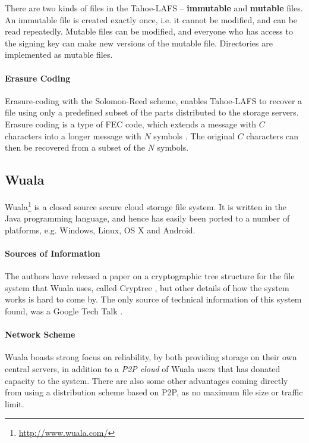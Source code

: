 \documentclass[pdftex,english,10pt,b5paper,twoside]{book}
\begin{document}
There are two kinds of files in the Tahoe-\ac{LAFS} -- \textbf{immutable} and
\textbf{mutable} files. An immutable file is created exactly once, i.e. it
cannot be modified, and can be read repeatedly. Mutable files can be modified,
and everyone who has access to the signing key can make new versions of
the mutable file. Directories are implemented as mutable files.

\paragraph{Erasure Coding}

Erasure-coding with the Solomon-Reed scheme, enables Tahoe-\ac{LAFS} to recover
a file using only a predefined subset of the parts distributed to the storage
servers. Erasure coding is a type of \ac{FEC} code, which extends a message
with $C$ characters into a longer message with $N$ symbols
\cite{t_reed-solomon}. The original $C$ characters can then be recovered from a
subset of the $N$ symbols.

\subsection{Wuala}

Wuala\footnote{\url{http://www.wuala.com/}} is a closed source secure cloud
storage file system. It is written in the Java programming language, and
hence has easily been ported to a number of platforms, e.g. Windows, Linux, OS
X and Android.

\paragraph{Sources of Information} The authors have released a paper on a
cryptographic tree structure for the file system that Wuala uses, called
Cryptree \cite{cryptree}, but other details of how the system works is hard to
come by. The only source of technical information of this system found, was a
Google Tech Talk \cite{wuala}. 

\paragraph{Network Scheme} Wuala boasts strong focus on reliability, by both
providing storage on their own central servers, in addition to a \emph{\ac{P2P}
cloud} of Wuala users that has donated capacity to the system. There are also
some other advantages coming directly from using a distribution scheme based on
\ac{P2P}, as no maximum file size or traffic limit.
\end{document}
